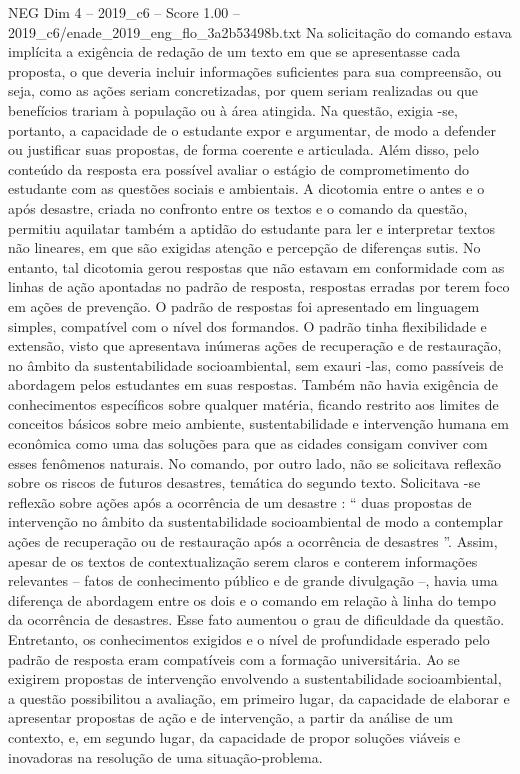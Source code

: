 \begin{textsample}{NEG Dim 4 – 2019\_c6 – Score 1.00 – 2019\_c6/enade\_2019\_eng\_flo\_3a2b53498b.txt}
Na solicitação do comando estava implícita a exigência de redação de um texto em que se apresentasse cada proposta, o que deveria incluir informações suficientes para sua compreensão, ou seja, como as ações seriam concretizadas, por quem seriam realizadas ou que benefícios trariam à população ou à área atingida.
Na questão, exigia -se, portanto, a capacidade de o estudante expor e argumentar, de modo a defender ou justificar suas propostas, de forma coerente e articulada.
Além disso, pelo conteúdo da resposta era possível avaliar o estágio de comprometimento do estudante com as questões sociais e ambientais.
A dicotomia entre o antes e o após desastre, criada no confronto entre os textos e o comando da questão, permitiu aquilatar também a aptidão do estudante para ler e interpretar textos não lineares, em que são exigidas atenção e percepção de diferenças sutis.
No entanto, tal dicotomia gerou respostas que não estavam em conformidade com as linhas de ação apontadas no padrão de resposta, respostas erradas por terem foco em ações de prevenção.
O padrão de respostas foi apresentado em linguagem simples, compatível com o nível dos formandos.
O padrão tinha flexibilidade e extensão, visto que apresentava inúmeras ações de recuperação e de restauração, no âmbito da sustentabilidade socioambiental, sem exauri -las, como passíveis de abordagem pelos estudantes em suas respostas.
Também não havia exigência de conhecimentos específicos sobre qualquer matéria, ficando restrito aos limites de conceitos básicos sobre meio ambiente, sustentabilidade e intervenção humana em econômica como uma das soluções para que as cidades consigam conviver com esses fenômenos naturais.
No comando, por outro lado, não se solicitava reflexão sobre os riscos de futuros desastres, temática do segundo texto.
Solicitava -se reflexão sobre ações após a ocorrência de um desastre : “ duas propostas de intervenção no âmbito da sustentabilidade socioambiental de modo a contemplar ações de recuperação ou de restauração após a ocorrência de desastres ”.
Assim, apesar de os textos de contextualização serem claros e conterem informações relevantes – fatos de conhecimento público e de grande divulgação –, havia uma diferença de abordagem entre os dois e o comando em relação à linha do tempo da ocorrência de desastres.
Esse fato aumentou o grau de dificuldade da questão.
Entretanto, os conhecimentos exigidos e o nível de profundidade esperado pelo padrão de resposta eram compatíveis com a formação universitária.
Ao se exigirem propostas de intervenção envolvendo a sustentabilidade socioambiental, a questão possibilitou a avaliação, em primeiro lugar, da capacidade de elaborar e apresentar propostas de ação e de intervenção, a partir da análise de um contexto, e, em segundo lugar, da capacidade de propor soluções viáveis e inovadoras na resolução de uma situação-problema.

\end{textsample}
